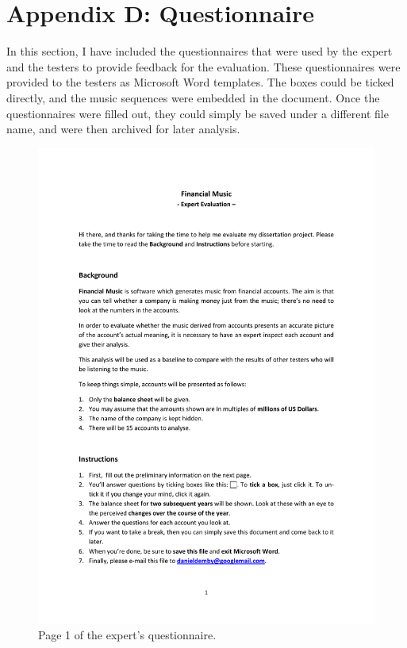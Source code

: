 \section{Appendix D: Questionnaire}

In this section, I have included the questionnaires that were used by the expert and the testers to provide feedback for the evaluation. These questionnaires were provided to the testers as Microsoft Word templates. The boxes could be ticked directly, and the music sequences were embedded in the document. Once the questionnaires were filled out, they could simply be saved under a different file name, and were then archived for later analysis.

\begin{figure}[ht]
\centering
\includegraphics[scale=0.6]{qa1}
\caption{Page 1 of the expert's questionnaire.}
\label{fig:qa1}
\end{figure}

